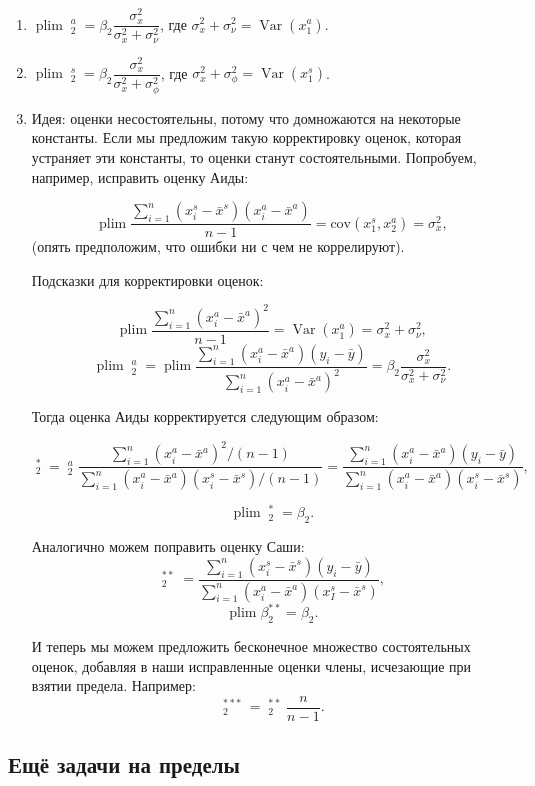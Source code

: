 \documentclass[10pt, a4paper]{extarticle}
\DeclareMathOperator{\plim}{plim}
\DeclareMathOperator{\Var}{Var}
\DeclareMathOperator{\hb}{\hat{\beta}}
\begin{document}
\begin{enumerate}
	\item $\plim \hb_2^a = \beta_2 \dfrac{\sigma_x^2}{\sigma_x^2 + \sigma_\nu^2}$, где $\sigma_x^2 + \sigma_\nu^2 = \Var(x_1^a)$.
	
	\item $\plim \hb_2^s = \beta_2 \dfrac{\sigma_x^2}{\sigma_x^2 + \sigma_\phi^2}$, где $\sigma_x^2 + \sigma_\phi^2 = \Var(x_1^s)$.
	
	\item 
	
	Идея: оценки несостоятельны, потому что домножаются на некоторые константы. Если мы предложим такую корректировку оценок, которая устраняет эти константы, то оценки станут состоятельными. Попробуем, например, исправить оценку Аиды:
	
	\[\plim \dfrac{\sum_{i = 1}^n(x_i^s - \bar{x}^s)(x_i^a - \bar{x}^a)}{n - 1} = \text{cov}(x_1^s, x_2^a) = \sigma_x^2,\] (опять предположим, что ошибки ни с чем не коррелируют).
	
	Подсказки для корректировки оценок:
	
	\[\plim \dfrac{\sum_{i = 1}^n(x_i^a - \bar{x}^a)^2}{n - 1}  = \Var(x_1^a) = \sigma_x^2 + \sigma_\nu^2,\]
	\[\plim \hb_2^a = \plim \dfrac{\sum_{i = 1}^n(x_i^a - \bar{x}^a)(y_i - \bar{y})}{\sum_{i = 1}^n(x_i^a - \bar{x}^a)^2} = \beta_2 \dfrac{\sigma_x^2}{\sigma_x^2 + \sigma_\nu^2}.\]
	
	Тогда оценка Аиды корректируется следующим образом:
	
	\[\hb_2^* = \hb_2^a \dfrac{\sum_{i = 1}^n(x_i^a - \bar{x}^a)^2 / (n - 1)}{\sum_{i = 1}^n(x_i^a - \bar{x}^a)(x_i^s - \bar{x}^s) / (n - 1)} = \dfrac{\sum_{i = 1}^n(x_i^a - \bar{x}^a)(y_i - \bar{y})}{\sum_{i = 1}^n(x_i^a - \bar{x}^a)(x_i^s - \bar{x}^s)},\]
	
	\[\plim \hb_2^* = \beta_2.\]
	
	Аналогично можем поправить оценку Саши:
	\[\hb_2^{**} = \dfrac{\sum_{i = 1}^n(x_i^s - \bar{x}^s)(y_i - \bar{y})}{\sum_{i = 1}^n(x_i^a - \bar{x}^a)(x_I^s - \bar{x}^s)},\]
	\[\plim \beta_2^{**} = \beta_2.\]
	
	И теперь мы можем предложить бесконечное множество состоятельных оценок, добавляя в наши исправленные оценки члены, исчезающие при взятии предела. Например:
	\[\hb_2^{***} = \hb_2^{**} \frac{n}{n-1}.\]
	
\end{enumerate}

\subsection{Ещё задачи на пределы}
\end{document}
